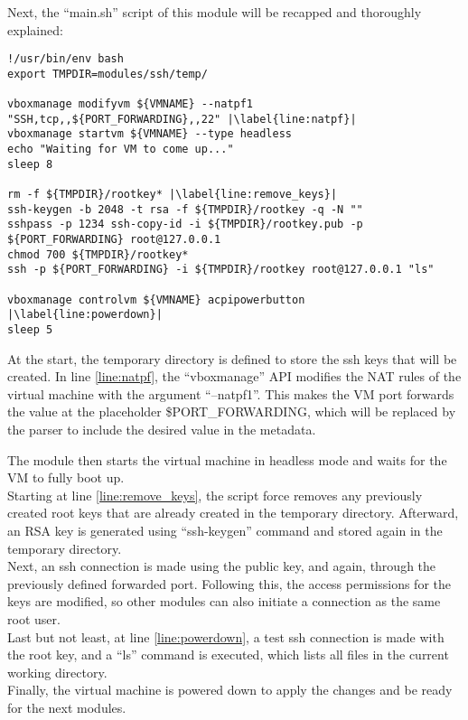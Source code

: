 Next, the “main.sh” script of this module will be recapped and thoroughly explained:


\clearpage

\begin{lstlisting}[caption=ssh main.sh, style=pythonstyle, escapechar=|]
!/usr/bin/env bash
export TMPDIR=modules/ssh/temp/

vboxmanage modifyvm ${VMNAME} --natpf1 "SSH,tcp,,${PORT_FORWARDING},,22" |\label{line:natpf}|
vboxmanage startvm ${VMNAME} --type headless
echo "Waiting for VM to come up..."
sleep 8

rm -f ${TMPDIR}/rootkey* |\label{line:remove_keys}|
ssh-keygen -b 2048 -t rsa -f ${TMPDIR}/rootkey -q -N ""
sshpass -p 1234 ssh-copy-id -i ${TMPDIR}/rootkey.pub -p ${PORT_FORWARDING} root@127.0.0.1
chmod 700 ${TMPDIR}/rootkey*
ssh -p ${PORT_FORWARDING} -i ${TMPDIR}/rootkey root@127.0.0.1 "ls"

vboxmanage controlvm ${VMNAME} acpipowerbutton |\label{line:powerdown}|
sleep 5
\end{lstlisting}

At the start, the temporary directory is defined to store the ssh keys that will be created.
In line \ref{line:natpf}, the “vboxmanage” API modifies the NAT rules of the virtual machine with the argument “--natpf1”. This makes the VM port forwards the value at the placeholder \${PORT\_FORWARDING}, which will be replaced by the parser to include the desired value in the metadata.

The module then starts the virtual machine in headless mode and waits for the VM to fully boot up.\\
Starting at line \ref{line:remove_keys}, the script force removes any previously created root keys that are already created in the temporary directory. Afterward, an RSA key is generated using “ssh-keygen” command and stored again in the temporary directory.\\
Next, an ssh connection is made using the public key, and again, through the previously defined forwarded port. Following this, the access permissions for the keys are modified, so other modules can also initiate a connection as the same root user.\\
Last but not least, at line \ref{line:powerdown}, a test ssh connection is made with the root key, and a “ls” command is executed, which lists all files in the current working directory.\\
Finally, the virtual machine is powered down to apply the changes and be ready for the next modules.


